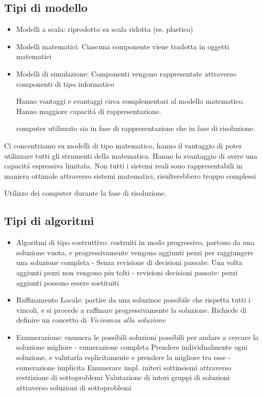 \documentclass{article}
\begin{document}
\subsection{Tipi di modello}
\begin{itemize}
    \item Modelli a scala:
        riprodotto su scala ridotta (es. plastico)
    \item Modelli matematici:
        Ciascuna componente viene tradotta in oggetti matematici
    \item Modelli di simulazione:
        Componenti vengono rappresentate attraverso componenti di tipo informatico

        Hanno vantaggi e svantaggi circa complementari al modello matematico.
        Hanno maggiore capacitá di rappresentazione.

        computer utilizzato sia in fase di rappresentazione che in fase di risoluzione.
\end{itemize}
Ci concentriamo su modelli di tipo matematico, hanno il vantaggio di poter utilizzare tutti gli strumenti della matematica. Hanno lo svantaggio di avere una capacitá espressiva limitata.
Non tutti i sistemi reali sono rappresentabili in maniera ottimale attraverso sistemi matematici, risulterebbero troppo complessi

Utilizzo dei computer durante la fase di risoluzione.
\subsection{Tipi di algoritmi}
\begin{itemize}
    \item Algoritmi di tipo costruttivo:
        costruiti in modo progressivo, partono da una soluzione vuota, e progressivamente vengono aggiunti pezzi per raggiungere una soluzione completa
        -  Senza revisione di decisioni passate:
            Una volta aggiunti pezzi non vengono piu tolti
        - revisioni decisioni passate:
            pezzi aggiunti possono essere sostituiti

    \item Raffinamento Locale:
        partire da una soluzinoe possibile che rispetta tutti i vincoli, e si procede a raffinare progressivamente la soluzione.
        Richiede di definire un concetto di \textit{Vicinanza alla soluzione}
    \item Enumerazione:
        enumera le possibili soluzioni possibili per andare a cercare la soluzione migliore
        - eumerazione completa
            Prendere individualmente ogni soluzione, e valutarla esplicitamente e prendere la migliore tra esse
        - eumerazione implicita
            Enumerare impl. initeri sottinsiemi attraverso restrizione di sottoproblemi
            Valutazione di interi gruppi di soluzioni attraverso soluzioni di sottoproblemi
\end{itemize}
\end{document}
